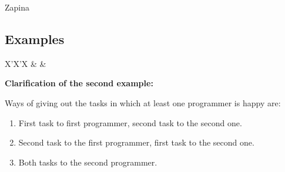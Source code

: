\begin{statement}[
  problempoints=110,
  timelimit=1 second,
  memorylimit=512 MiB,
]{Zapina}
\subsection*{Examples}
\begin{tabularx}{\textwidth}{X'X'X}
 &
 &
\end{tabularx}

\textbf{Clarification of the second example:}

Ways of giving out the tasks in which at least one programmer is
happy are:
\begin{enumerate}
  \item First task to first programmer, second task to the second one.
  \item Second task to the first programmer, first task to the second one.
  \item Both tasks to the second programmer.
\end{enumerate}

\end{statement}

